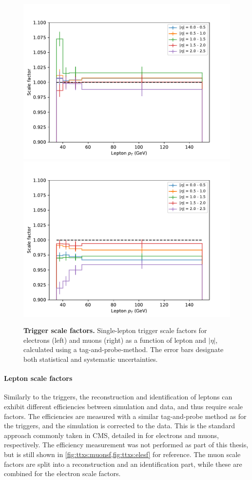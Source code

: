 \begin{figure}[t]
    \centering
    \includegraphics[width=0.49 \textwidth]{figures/ttxs/scalefactors/triggersf_ele.pdf}
    \hfill
    \includegraphics[width=0.49 \textwidth]{figures/ttxs/scalefactors/triggersf_muon.pdf}
    \caption{\textbf{Trigger scale factors.} Single-lepton trigger scale factors for electrons (left) and muons (right) as a function of lepton \pt and $|\eta|$, calculated using a tag-and-probe-method. The error bars designate both statistical and systematic uncertainties. }
    \label{fig:ttxs:triggersf}
\end{figure}

\paragraph{Lepton scale factors}

Similarly to the triggers, the reconstruction and identification of leptons can exhibit different efficiencies between simulation and data, and thus require scale factors.
The efficiencies are measured with a similar tag-and-probe method as for the triggers, and the simulation is corrected to the data. This is the standard approach commonly taken in CMS, detailed in  for electrons and muons, respectively.%
The efficiency measurement was not performed as part of this thesis, but is still shown in \cref{fig:ttxs:muonsf,fig:ttxs:elesf} for reference. The muon scale factors are split into a reconstruction and an identification part, while these are combined for the electron scale factors.  

